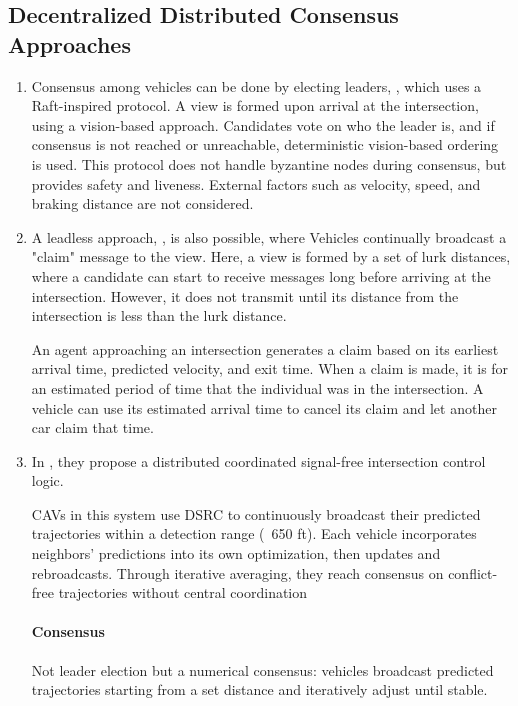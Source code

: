 \documentclass[fleqn,10pt]{olplainarticle}
\begin{document}
\subsection{Decentralized Distributed Consensus Approaches}

\begin{enumerate}
    \item 

Consensus among vehicles can be done by electing leaders, \cite{lee2025distributedconsensusalgorithmprioritizing}, which uses a Raft-inspired protocol. A view is formed upon arrival at the intersection, using a vision-based approach. 
Candidates vote on who the leader is, and if consensus is not reached or unreachable, deterministic vision-based ordering is used. This protocol does not handle byzantine nodes during consensus, but provides safety and liveness. External factors such as velocity, speed, and braking distance are not considered. 


\item 
A leadless approach, \cite{inproceedings}, is also possible, where Vehicles continually broadcast a "claim" message to the view. Here, a view is formed by a set of lurk distances, where a candidate can start to receive messages long before arriving at the intersection. However, it does not transmit until its distance from the intersection is less than the lurk distance.  

An agent approaching an intersection generates a claim based on its earliest arrival time, predicted velocity, and exit time. When a claim is made, it is for an estimated period of time that the individual was in the intersection. 
A vehicle can use its estimated arrival time to cancel its claim and let another car claim that time. 


\item 
In \cite{MIRHELI2019161}, they propose a distributed coordinated signal-free intersection control logic. 

CAVs in this system use DSRC to continuously broadcast their predicted trajectories within a detection range (~650 ft). Each vehicle incorporates neighbors’ predictions into its own optimization, then updates and rebroadcasts. Through iterative averaging, they reach consensus on conflict-free trajectories without central coordination

\paragraph{Consensus}
Not leader election but a {numerical consensus}: vehicles broadcast predicted trajectories starting from a set distance and iteratively adjust until stable. 


\end{enumerate}
\end{document}
